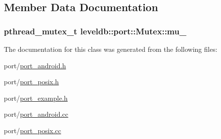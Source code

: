 \subsection{Member Data Documentation}
\hypertarget{classleveldb_1_1port_1_1_mutex_aa3574934fb8d1cdad3467f72fceaa5b8}{}
\subsubsection[{mu\+\_\+}]{\setlength{\rightskip}{0pt plus 5cm}pthread\+\_\+mutex\+\_\+t leveldb\+::port\+::\+Mutex\+::mu\+\_\+\hspace{0.3cm}{\ttfamily [private]}}\label{classleveldb_1_1port_1_1_mutex_aa3574934fb8d1cdad3467f72fceaa5b8}


The documentation for this class was generated from the following files\+:\begin{DoxyCompactItemize}
\item 
port/\hyperlink{port__android_8h}{port\+\_\+android.\+h}\item 
port/\hyperlink{port__posix_8h}{port\+\_\+posix.\+h}\item 
port/\hyperlink{port__example_8h}{port\+\_\+example.\+h}\item 
port/\hyperlink{port__android_8cc}{port\+\_\+android.\+cc}\item 
port/\hyperlink{port__posix_8cc}{port\+\_\+posix.\+cc}\end{DoxyCompactItemize}
